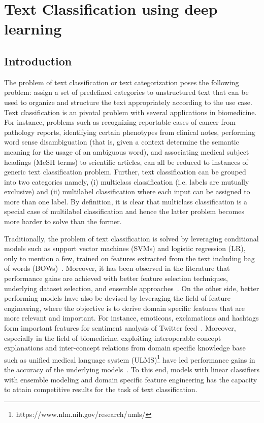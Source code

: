 \chapter{Text Classification using deep learning}\label{chap:nnmethod}

\section{Introduction}

The problem of text classification or text categorization poses the following problem: assign a set of predefined categories to unstructured text that can be used to organize and structure the text appropriately according to the use case. Text classification is an pivotal problem with several applications in biomedicine. For instance, problems such as recognizing reportable cases of cancer from pathology reports, identifying certain phenotypes from clinical notes, performing word sense disambiguation (that is, given a context determine the semantic meaning for the usage of an ambiguous word), and associating medical subject headings (MeSH terms) to scientific articles, can all be reduced to instances of generic text classification problem. Further, text classification can be grouped into two categories namely, (i) multiclass classification (i.e. labels are mutually exclusive) and (ii) multilabel classification where each input can be assigned to more than one label. By definition, it is clear that multiclass classification is a special case of multilabel classification and hence the latter problem becomes more harder to solve than the former.


Traditionally, the problem of text classification is solved by leveraging conditional models such as support vector machines (SVMs) and logistic regression (LR), only to mention a few, trained on features extracted from the text including bag of words (BOWs)~\cite{sebastiani2005text}. Moreover, it has been observed in the literature that performance gains are achieved with better feature selection techniques, underlying dataset selection, and ensemble approaches~\cite{zhou2012ensemble}. On the other side, better performing models have also be devised by leveraging the field of feature engineering, where the objective is to derive domain specific features that are more relevant and important. For instance, emoticons, exclamations and hashtags form important features for sentiment analysis of Twitter feed~\cite{kiritchenko2014sentiment}. Moreover, especially in the field of biomedicine, exploiting interoperable concept explanations and inter-concept relations from domain specific knowledge base such as unified medical language system (ULMS)\footnote{https://www.nlm.nih.gov/research/umls/} have led performance gains in the accuracy of the underlying models~\cite{yepes2015knowledge}. To this end, models with linear classifiers with ensemble modeling and domain specific feature engineering has the capacity to attain competitive results for the task of text classification.


